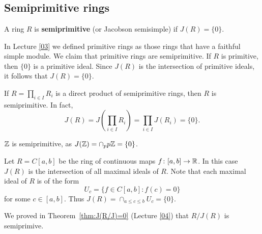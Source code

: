 \section{}



\subsection{Semiprimitive rings}

\begin{definition}
	A ring $R$ is \textbf{semiprimitive} (or Jacobson semisimple) if  $J(R)=\{0\}$.
\end{definition}

In Lecture \ref{03} we defined primitive rings as
those rings that have a faithful simple module.  We claim that primitive rings
are semiprimitive. If $R$ is primitive, then $\{0\}$ is a primitive ideal. Since
$J(R)$ is the intersection of primitive ideals, it follows that $J(R)=\{0\}$.

\begin{example}
	If $R=\prod_{i\in I}R_i$ is a direct product of semiprimitive rings, then
	$R$ is semiprimitive. In fact, 
	\[
		J(R)=J\left(\prod_{i\in I}R_i\right)=\prod_{i\in I}J(R_i)=\{0\}.
	\]
\end{example}

\begin{example}
$\mathbb{Z}$ is semiprimitive, as $J(\mathbb{Z})=\cap_{p}p\mathbb{Z}=\{0\}$.
\end{example}

\begin{example}
	\label{exa:C[a,b]}
	Let $R=C[a,b]$ be the ring of continuous maps $f\colon [a,b]\to\mathbb{R}$. 
	In this case $J(R)$ is the intersection of all maximal ideals of $R$. Note that 
	each maximal ideal of $R$ is of the form 
	\[
		U_c=\{f\in C[a,b]:f(c)=0\}
	\]
	for some $c\in[a,b]$. 
	Thus $J(R)=\cap_{a\leq c\leq
	b}U_c=\{0\}$.
\end{example}

We proved in Theorem~\ref{thm:J(R/J)=0} (Lecture \ref{04}) 
that $R/J(R)$ is semiprimive. 

%
%


